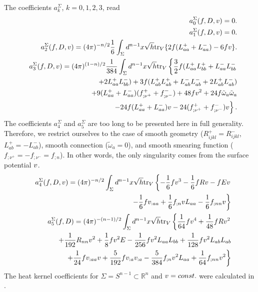The coefficients $a_k^\Sigma$, $k=0,1,2,3$, read
\begin{eqnarray}
&&a_0^\Sigma(f,D,v)=0.\nonumber\\
&&a_1^\Sigma(f,D,v)=0.\nonumber\\
&&a_2^\Sigma(f,D,v)=
     (4\pi)^{-n/2}\frac16\int_\Sigma d^{n-1}x\sqrt{h}
       {\rm tr}_V \{2f(L_{aa}^++L_{aa}^-)-6fv\}.\label{asig03}\\
&&a_3^\Sigma(f,D,v)=(4\pi)^{(1-n)/2}\frac1{384}
\int_\Sigma d^{n-1}x\sqrt{h}
{\rm tr}_V\left\{\frac32f(L_{aa}^+L_{bb}^+
+L_{aa}^-L_{bb}^-\right.  \nonumber\\
&&\qquad +2L_{aa}^+L_{bb}^-)
    +3f(L_{ab}^+L_{ab}^++L_{ab}^-L_{ab}^-+2L_{ab}^+L_{ab}^-)
\nonumber\\
&&\qquad    +9(L_{aa}^++L_{aa}^-)(f_{;\nu^+}^++f_{;\nu^-}^-)
+48fv^2+24f\tilde\omega_a\tilde\omega_a \nonumber\\
&&\qquad \left.   -24f(L_{aa}^++L_{aa}^-)v
    -24(f_{;\nu^+}^++f_{;\nu^-}^-)v\right\}.\nonumber
\end{eqnarray}
The coefficients $a_4^\Sigma$ and $a_5^\Sigma$ are too long to be
presented here in full generality. Therefore, we restrict ourselves to 
the case of smooth geometry ($R_{ijkl}^+=R^-_{ijkl}$, $L_{ab}^+=-L_{ab}^-$),
smooth connection ($\tilde\omega_a=0$), and smooth smearing function
($f_{;\nu^+}=-f_{;\nu^-}=f_{;n}$). In other words, the only singularity comes
from the surface potential $v$.
\begin{eqnarray}
&&a_4^\Sigma (f,D,v)=(4\pi )^{-n/2}
\int_\Sigma d^{n-1}x\sqrt{h}{\rm tr}_V\left\{ -\frac 16 fv^3 -\frac 1{6}
fR v -fEv \right. \nonumber \\
&&\qquad \left. -\frac 16 fv_{:aa} +\frac 16 f_{;n}v L_{aa} 
-\frac 16 f_{;nn}v
\right\} \nonumber \\
&&a_5^\Sigma (f,D)= (4\pi )^{-(n-1)/2} \int_\Sigma d^{n-1}x\sqrt{h}{\rm tr}_V
\left\{\frac 1{64} fv^4 +\frac 1{48} fR v^2
 \right. \label{asig45}\\
&&\qquad +\frac 1{192}R_{nn}v^2 +\frac 18 fv^2 E 
-\frac 1{256} fv^2 L_{aa}L_{bb} 
+\frac 1{128}fv^2 L_{ab}L_{ab}  \nonumber \\
&&\qquad \left. +\frac 1{24}fv_{:aa}v
+\frac 5{192} fv_{:a}v_{:a} -\frac 5{384}f_{;n} v^2L_{aa}
+\frac 1{64}f_{;nn}v^2 \right\}
\nonumber
\end{eqnarray}
The heat kernel coefficients for $\Sigma =S^{n-1}\subset\mathbb{R}^n$
and $v =const.$ were calculated in \cite{Bordag:1998vs}.
